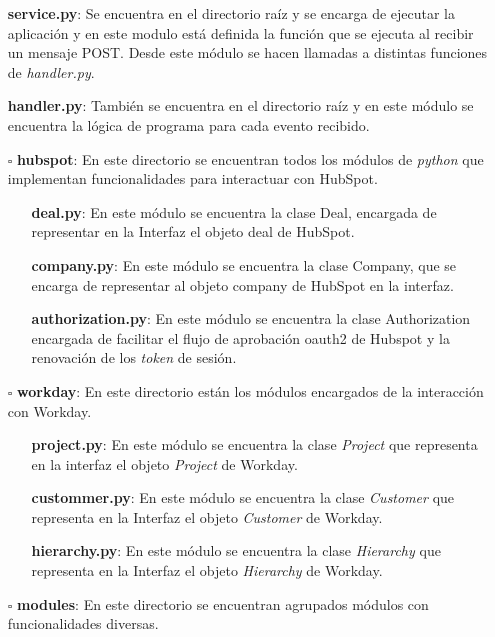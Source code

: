 \begin{itemize}

	\item [\textendash] \textbf{service.py}: Se encuentra en el directorio raíz y se encarga de ejecutar la aplicación 
	y en este modulo está definida la función que se ejecuta al recibir un mensaje POST. Desde este módulo se hacen llamadas a distintas funciones de \textit{handler.py}.
	\item [\textendash] \textbf{handler.py}: También se encuentra en el directorio raíz y en este módulo se encuentra la lógica de programa para cada evento recibido.
	\item[$\square$] \textbf{hubspot}: En este directorio se encuentran todos los módulos de \textit{python} que implementan funcionalidades para interactuar con HubSpot.
	
		\begin{itemize}
			\item [\textendash] \textbf{deal.py}: En este módulo se encuentra la clase Deal, encargada de representar en la Interfaz el objeto deal de HubSpot.
			\item [\textendash] \textbf{company.py}: En este módulo se encuentra la clase Company, que se encarga de representar al objeto company de HubSpot en la interfaz.
			\item [\textendash] \textbf{authorization.py}: En este módulo se encuentra la clase Authorization encargada de facilitar el flujo de aprobación \gls{oauth2} de Hubspot y la renovación de los \textit{token} de sesión.
		\end{itemize}
		
	\item[$\square$] \textbf{workday}: En este directorio están los módulos encargados de la interacción con Workday.
	
		\begin{itemize}
			\item [\textendash] \textbf{project.py}: En este módulo se encuentra la clase \textit{Project} que representa en la interfaz el objeto \textit{Project} de Workday.
			\item [\textendash] \textbf{custommer.py}: En este módulo se encuentra la clase \textit{Customer} que representa en la Interfaz el objeto \textit{Customer} de Workday.
			\item [\textendash] \textbf{hierarchy.py}: En este módulo se encuentra la clase \textit{Hierarchy} que representa en la Interfaz el objeto \textit{Hierarchy} de Workday.
		\end{itemize}
	\item[$\square$] \textbf{modules}: En este directorio se encuentran agrupados módulos con funcionalidades diversas. 
	

\end{itemize}
